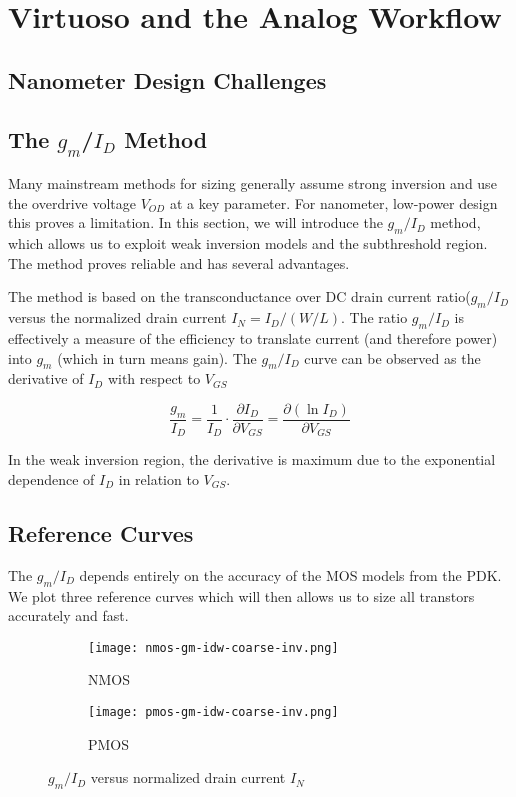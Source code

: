 \documentclass[../main.tex]{subfiles}
\begin{document}
\section{Virtuoso and the Analog Workflow}

\subsection{Nanometer Design Challenges}

\subsection{The $g_m$/$I_D$ Method}

Many mainstream methods for sizing generally assume strong inversion and use the overdrive voltage $V_{OD}$ at a key parameter. For nanometer, low-power design this proves a limitation. In this section, we will introduce the $g_m/I_D$ method, which allows us to exploit weak inversion models and the subthreshold region. The method proves reliable and has several advantages. \vspace*{10pt}

The method is based on the transconductance over DC drain current ratio($g_m/I_D$ versus the normalized drain current $I_N = I_D/(W/L)$. The ratio $g_m/I_D$ is effectively a measure of the efficiency to translate current (and therefore power) into $g_m$ (which in turn means gain). The $g_m/I_D$ curve can be observed as the derivative of $I_D$ with respect to $V_{GS}$

$$ 
\frac{g_m}{I_D} = \frac{1}{I_D} \cdot \frac{\partial I_D}{\partial V_{GS}} = \frac{\partial (\ln I_D)}{\partial V_{GS}}
$$

\noindent
In the weak inversion region, the derivative is maximum due to the exponential dependence of $I_D$ in relation to $V_{GS}$.

\pagebreak

\subsection{Reference Curves}

The $g_m/I_D$ depends entirely on the accuracy of the MOS models from the PDK. We plot three reference curves which will then allows us to size all transtors accurately and fast.

\begin{figure}[H]
    \centering
    \begin{subfigure}{0.5\textwidth}
      \centering
      \texttt{[image: nmos-gm-idw-coarse-inv.png]}
      \caption{NMOS}
    \end{subfigure}%
    \begin{subfigure}{0.5\textwidth}
      \centering
      \texttt{[image: pmos-gm-idw-coarse-inv.png]}
      \caption{PMOS}
    \end{subfigure}
    \caption{$g_m/I_D$ versus normalized drain current $I_N$}
\end{figure}
\end{document}
